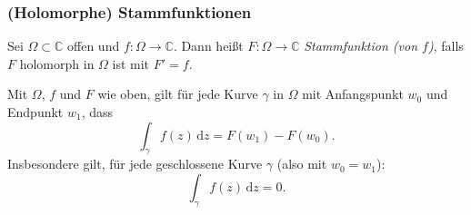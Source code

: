 \documentclass[10pt]{beamer}
\begin{document}
\begin{frame}
	\frametitle{(Holomorphe) Stammfunktionen}
	\begin{definition}
		Sei $\Omega \subset \mathbb{C}$ offen und $f \colon \Omega \to \mathbb{C}$.
		Dann heißt $F \colon \Omega \to \mathbb{C}$ \emph{Stammfunktion (von $f$)}, falls $F$ holomorph in $\Omega$ ist mit $F' = f$.
	\end{definition}
	\pause
	\begin{theorem}
		Mit $\Omega$, $f$ und $F$ wie oben, gilt für jede Kurve $\gamma$ in $\Omega$ mit Anfangspunkt $w_0$ und Endpunkt $w_1$, dass
		\[
			\int_{\gamma} f(z) \,\mathrm{d}z = F(w_1) - F(w_0).
		\]
		Insbesondere gilt, für jede geschlossene Kurve $\gamma$ (also mit $w_0 = w_1$):
		\[
			\int_{\gamma} f(z) \,\mathrm{d}z = 0.
		\]
	\end{theorem}
\end{frame}
\end{document}
